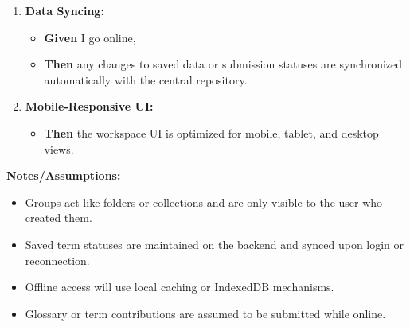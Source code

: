 \begin{enumerate}
    \item \textbf{Data Syncing:}
    \begin{itemize}
        \item \textbf{Given} I go online,
        \item \textbf{Then} any changes to saved data or submission statuses are synchronized automatically with the central repository.
    \end{itemize}

    \item \textbf{Mobile-Responsive UI:}
    \begin{itemize}
        \item \textbf{Then} the workspace UI is optimized for mobile, tablet, and desktop views.
    \end{itemize}
\end{enumerate}

\vspace{1em}
\textbf{Notes/Assumptions:}
\begin{itemize}
    \item Groups act like folders or collections and are only visible to the user who created them.
    \item Saved term statuses are maintained on the backend and synced upon login or reconnection.
    \item Offline access will use local caching or IndexedDB mechanisms.
    \item Glossary or term contributions are assumed to be submitted while online.
\end{itemize}
